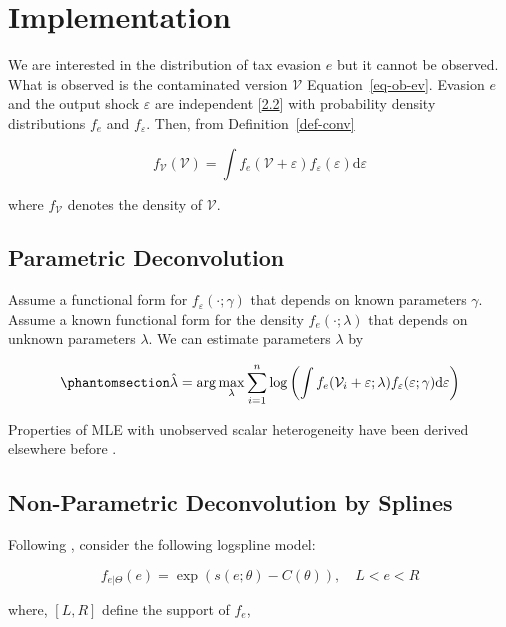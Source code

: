 \documentclass[
  12pt]{article}
\theoremstyle{definition}
\theoremstyle{remark}
\begin{document}
\section{Implementation}\label{implementation}

We are interested in the distribution of tax evasion \(e\) but it cannot
be observed. What is observed is the contaminated version
\(\mathcal{V}\) Equation~\ref{eq-ob-ev}. Evasion \(e\) and the output
shock \(\varepsilon\) are independent {[}\hyperref[ass-ind]{2.2}{]} with
probability density distributions \(f_e\) and \(f_{\varepsilon}\). Then,
from Definition~\ref{def-conv}

\[
f_{\mathcal{V}}(\mathcal{V})=\int f_e(\mathcal{V}+\varepsilon)f_{\varepsilon}(\varepsilon)\text{d}\varepsilon
\]

where \(f_{\mathcal{V}}\) denotes the density of \(\mathcal{V}\).

\subsection{Parametric Deconvolution}\label{parametric-deconvolution}

Assume a functional form for \(f_{\varepsilon}(\cdot;\gamma)\) that
depends on known parameters \(\gamma\). Assume a known functional form
for the density \(f_e(\cdot;\lambda)\) that depends on unknown
parameters \(\lambda\). We can estimate parameters \(\lambda\) by

\begin{equation}\phantomsection\label{eq-mle}{
\hat \lambda = \arg \max_{\lambda}\sum_{i=1}^n \log \left(\int f_e(\mathcal{V}_i+\varepsilon;\lambda)f_{\varepsilon}(\varepsilon;\gamma)\text{d}\varepsilon\right)
}\end{equation}

Properties of MLE with unobserved scalar heterogeneity have been derived
elsewhere before \citep{Chen2007, Yi2021}.

\subsection{Non-Parametric Deconvolution by
Splines}\label{non-parametric-deconvolution-by-splines}

Following \citet{Kang2021}, consider the following logspline model:

\[
f_{e|\Theta}(e)=\exp(s(e;\theta)-C(\theta)), \quad L < e < R
\]

where, \([L,R]\) define the support of \(f_e\),
\end{document}
